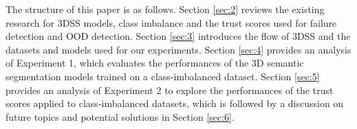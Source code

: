 \documentclass[journal]{IEEEtran}
\begin{document}
The structure of this paper is as follows. Section \ref{sec:2} reviews the existing research for 3DSS models, class imbalance and the trust scores used for failure detection and OOD detection. Section \ref{sec:3} introduces the flow of 3DSS and the datasets and models used for our experiments. Section \ref{sec:4} provides an analysis of Experiment 1, which evaluates the performances of the 3D semantic segmentation models trained on a class-imbalanced dataset. Section \ref{sec:5} provides an analysis of Experiment 2 to explore the performances of the trust scores applied to class-imbalanced datasets, which is followed by a discussion on future topics and potential solutions in Section \ref{sec:6}. 

\end{document}
